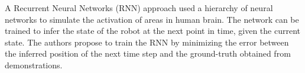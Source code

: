 \documentclass[utf8]{frontiersSCNS} %
\begin{document}
A Recurrent Neural Networks (RNN) approach \cite{billard2001learning} used a 
hierarchy of neural networks to simulate the activation of areas in human brain. The network can be trained to infer the state of the robot at the next point in time, given the current state. The authors propose to train the RNN by minimizing the error between the inferred position of the next time step and the ground-truth obtained from demonstrations.

%
\end{document}
